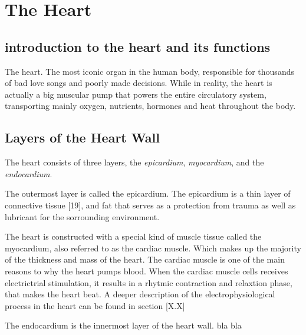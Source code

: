 \chapter{The  Heart}

\section{introduction to the heart and its functions}
The heart. The most iconic organ in the human body, responsible for thousands of bad love songs and poorly made decisions. While in reality, the heart is actually a big muscular pump that powers the entire circulatory system, transporting mainly oxygen, nutrients, hormones and heat throughout the body. 

\section{Layers of the Heart Wall}
The heart consists of three layers, the \textit{epicardium}, \textit{myocardium}, and the \textit{endocardium}. 

The outermost layer is called the epicardium. The epicardium is a thin layer of connective tissue [19], and fat that serves as a protection from trauma as well as lubricant for the sorrounding environment. 

The heart is constructed with a special kind of muscle tissue called the myocardium, also referred to as the cardiac muscle. Which makes up the majority of the thickness and mass of the heart. The cardiac muscle is one of the main reasons to why the heart pumps blood. When the cardiac muscle cells receives electrictrial stimulation, it results in a rhytmic contraction and relaxtion phase, that makes the heart beat. A deeper description of the electrophysiological process in the heart can be found in section [X.X]

The endocardium is the innermost layer of the heart wall. bla bla


